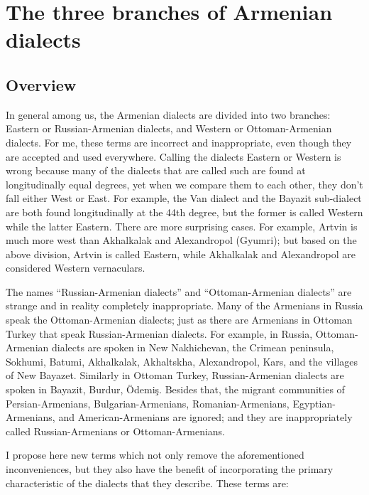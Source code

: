 \begin{adjarianpage}\label{page:34}\end{adjarianpage}%


\chapter{The three branches of Armenian dialects}\label{chapter:Branches}

\section{Overview}\label{sec:ThreeBranch:overview}



In general among us, the Armenian dialects are divided into two branches: Eastern or Russian-Armenian dialects, and Western or Ottoman-Armenian dialects. For me, these terms are incorrect and inappropriate, even though they are accepted and used everywhere. Calling the dialects Eastern or Western is wrong because many of the dialects that are called such are found at longitudinally equal degrees, yet when we compare them to each other, they don't fall either West or East. For example, the Van dialect and the Bayazit sub-dialect are both found longitudinally at the 44th degree, but the former is called Western while the latter Eastern. There are more surprising cases. For example, Artvin is much more west than Akhalkalak and Alexandropol (Gyumri); but based on the above division, Artvin is called Eastern, while Akhalkalak and Alexandropol are considered Western vernaculars. 

The names ``Russian-Armenian dialects'' and ``Ottoman-Armenian dialects'' are strange and in reality completely inappropriate. Many of the Armenians in Russia speak the Ottoman-Armenian dialects; just as there are Armenians in Ottoman Turkey that speak Russian-Armenian dialects. For example, in Russia,   Ottoman-Armenian dialects are spoken in New Nakhichevan, the Crimean peninsula, Sokhumi, Batumi,    Akhalkalak, Akhaltskha, Alexandropol, Kars, and the villages of New Bayazet. Similarly in Ottoman Turkey, Russian-Armenian dialects are spoken in Bayazit, Burdur, Ödemiş. Besides that, the migrant communities of Persian-Armenians, Bulgarian-Armenians, Romanian-Armenians, Egyptian-Armenians, and American-Armenians are ignored; and they are inappropriately called Russian-Armenians or Ottoman-Armenians. 

I propose here new terms which not only remove the aforementioned inconveniences, but they also have the benefit of incorporating the primary characteristic of the dialects that they describe. These terms are:


